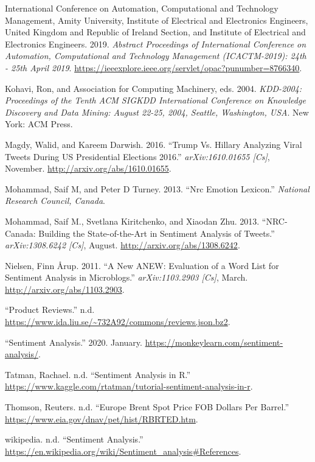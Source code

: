 \documentclass[]{article}
\begin{document}
\hypertarget{ref-international_conference_on_automation_abstract_2019}{}
International Conference on Automation, Computational and Technology
Management, Amity University, Institute of Electrical and Electronics
Engineers, United Kingdom and Republic of Ireland Section, and Institute
of Electrical and Electronics Engineers. 2019. \emph{Abstract
Proceedings of International Conference on Automation, Computational and
Technology Management (ICACTM-2019): 24th - 25th April 2019}.
\url{https://ieeexplore.ieee.org/servlet/opac?punumber=8766340}.

\hypertarget{ref-kohavi_kdd-2004_2004}{}
Kohavi, Ron, and Association for Computing Machinery, eds. 2004.
\emph{KDD-2004: Proceedings of the Tenth ACM SIGKDD International
Conference on Knowledge Discovery and Data Mining: August 22-25, 2004,
Seattle, Washington, USA}. New York: ACM Press.

\hypertarget{ref-magdy_trump_2016}{}
Magdy, Walid, and Kareem Darwish. 2016. ``Trump Vs. Hillary Analyzing
Viral Tweets During US Presidential Elections 2016.''
\emph{arXiv:1610.01655 {[}Cs{]}}, November.
\url{http://arxiv.org/abs/1610.01655}.

\hypertarget{ref-mohammad_nrc_2013}{}
Mohammad, Saif M, and Peter D Turney. 2013. ``Nrc Emotion Lexicon.''
\emph{National Research Council, Canada}.

\hypertarget{ref-mohammad_nrc-canada_2013}{}
Mohammad, Saif M., Svetlana Kiritchenko, and Xiaodan Zhu. 2013.
``NRC-Canada: Building the State-of-the-Art in Sentiment Analysis of
Tweets.'' \emph{arXiv:1308.6242 {[}Cs{]}}, August.
\url{http://arxiv.org/abs/1308.6242}.

\hypertarget{ref-nielsen_new_2011}{}
Nielsen, Finn Årup. 2011. ``A New ANEW: Evaluation of a Word List for
Sentiment Analysis in Microblogs.'' \emph{arXiv:1103.2903 {[}Cs{]}},
March. \url{http://arxiv.org/abs/1103.2903}.

\hypertarget{ref-noauthor_product_nodate}{}
``Product Reviews.'' n.d.
\url{https://www.ida.liu.se/~732A92/commons/reviews.json.bz2}.

\hypertarget{ref-noauthor_sentiment_2020}{}
``Sentiment Analysis.'' 2020. January.
\url{https://monkeylearn.com/sentiment-analysis/}.

\hypertarget{ref-tatman_sentiment_nodate}{}
Tatman, Rachael. n.d. ``Sentiment Analysis in R.''
\url{https://www.kaggle.com/rtatman/tutorial-sentiment-analysis-in-r}.

\hypertarget{ref-thomson_europe_nodate}{}
Thomson, Reuters. n.d. ``Europe Brent Spot Price FOB Dollars Per
Barrel.'' \url{https://www.eia.gov/dnav/pet/hist/RBRTED.htm}.

\hypertarget{ref-wikipedia_sentiment_nodate}{}
wikipedia. n.d. ``Sentiment Analysis.''
\url{https://en.wikipedia.org/wiki/Sentiment_analysis\#References}.
\end{document}
